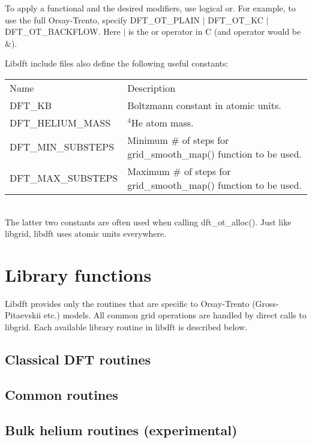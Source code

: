 \documentclass[12pt,letterpaper]{report}
\begin{document}
To apply a functional and the desired modifiers, use logical or. For example, to use the full Orsay-Trento, specify DFT\_OT\_PLAIN $|$ DFT\_OT\_KC $|$ DFT\_OT\_BACKFLOW. Here $|$ is the or operator in C (and operator would be \&).

Libdft include files also define the following useful constants:

\begin{tabular}{ll}
Name & Description\\
\cline{1-2}
DFT\_KB & Boltzmann constant in atomic units.\\
DFT\_HELIUM\_MASS & $^4$He atom mass.\\
DFT\_MIN\_SUBSTEPS & Minimum \# of steps for grid\_smooth\_map() function to be used.\\
DFT\_MAX\_SUBSTEPS & Maximum \# of steps for grid\_smooth\_map() function to be used.\\
\end{tabular}\\

\noindent
The latter two constants are often used when calling dft\_ot\_alloc(). Just like libgrid, libdft uses atomic units everywhere.

\chapter{Library functions}

Libdft provides only the routines that are specific to Orsay-Trento (Gross-Pitaevskii etc.) models. All common grid operations are handled by direct calls to libgrid. Each available library routine in libdft is described below.

\section{Classical DFT routines}



\section{Common routines}



\section{Bulk helium routines (experimental)}


\end{document}
